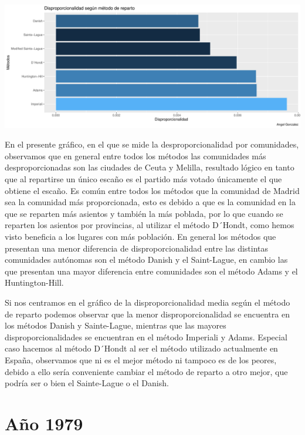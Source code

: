 \documentclass[12pt,a4paper,]{book}
\numberwithin{dummy}{section}
\theoremstyle{ocrenumbox}
\theoremstyle{blacknumex}
\theoremstyle{blacknumbox}
\theoremstyle{ocrenum}
\theoremstyle{ocrenum}
\begin{document}
\begin{center}\includegraphics[width=0.95\linewidth]{figurasR/unnamed-chunk-12-2} \end{center}

En el presente gráfico, en el que se mide la desproporcionalidad por
comunidades, observamos que en general entre todos los métodos las
comunidades más desproporcionadas son las ciudades de Ceuta y Melilla,
resultado lógico en tanto que al repartirse un único escaño es el
partido más votado únicamente el que obtiene el escaño. Es común entre
todos los métodos que la comunidad de Madrid sea la comunidad más
proporcionada, esto es debido a que es la comunidad en la que se
reparten más asientos y también la más poblada, por lo que cuando se
reparten los asientos por provincias, al utilizar el método D´Hondt,
como hemos visto beneficia a los lugares con más población. En general
los métodos que presentan una menor diferencia de disproporcionalidad
entre las distintas comunidades autónomas son el método Danish y el
Saint-Lague, en cambio las que presentan una mayor diferencia entre
comunidades son el método Adams y el Huntington-Hill.

Si nos centramos en el gráfico de la disproporcionalidad media según el
método de reparto podemos observar que la menor disproporcionalidad se
encuentra en los métodos Danish y Sainte-Lague, mientras que las mayores
disproporcionalidades se encuentran en el método Imperiali y Adams.
Especial caso hacemos al método D´Hondt al ser el método utilizado
actualmente en España, observamos que ni es el mejor método ni tampoco
es de los peores, debido a ello sería conveniente cambiar el método de
reparto a otro mejor, que podría ser o bien el Sainte-Lague o el Danish.

\hypertarget{auxf1o-1979}{%
\section{Año 1979}\label{auxf1o-1979}}
\end{document}
